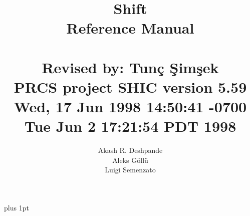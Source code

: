 


%
%
%
%


\parskip=2pt plus 1pt
\nonfrenchspacing
\renewcommand\topfraction{1}
\renewcommand\bottomfraction{1}
\renewcommand\textfraction{.1}



\newcommand{\Shift}{{\sc Shift}}

\def\todaysname{{\sc Shift}}

\title{\todaysname\\
Reference Manual\\
\ \\
{\normalsize
Revised by: Tun\c{c} \c{S}im\c{s}ek \\
PRCS project SHIC version 5.59\\
Wed, 17 Jun 1998 14:50:41 -0700
Tue Jun  2 17:21:54 PDT 1998 \\
}}

\author{Akash R. Deshpande\\Aleks G\"oll\"u\\Luigi Semenzato\\}

